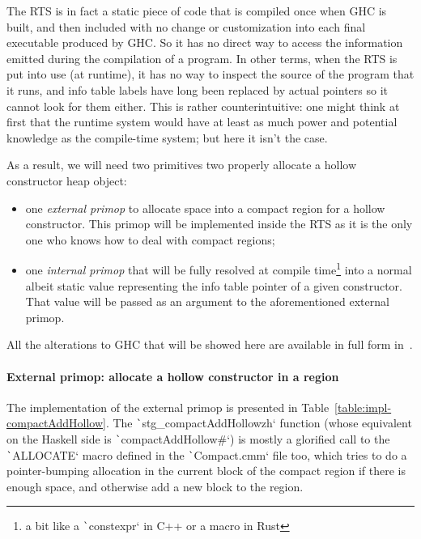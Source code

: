 \documentclass[english]{jflart}
\begin{document}
The RTS is in fact a static piece of code that is compiled once when GHC is built, and then included with no change or customization into each final executable produced by GHC. So it has no direct way to access the information emitted during the compilation of a program. In other terms, when the RTS is put into use (at runtime), it has no way to inspect the source of the program that it runs, and info table labels have long been replaced by actual pointers so it cannot look for them either. This is rather counterintuitive: one might think at first that the runtime system would have at least as much power and potential knowledge as the compile-time system; but here it isn't the case.

As a result, we will need two primitives two properly allocate a hollow constructor heap object:

\begin{itemize}
\item one \emph{external primop} to allocate space into a compact region for a hollow constructor. This primop will be implemented inside the RTS as it is the only one who knows how to deal with compact regions;
\item one \emph{internal primop} that will be fully resolved at compile time\footnote{a bit like a \texttt`constexpr` in C++ or a macro in Rust} into a normal albeit static value representing the info table pointer of a given constructor. That value will be passed as an argument to the aforementioned external primop.
\end{itemize}

All the alterations to GHC that will be showed here are available in full form in~\cite{custom_ghc}.

\paragraph{External primop: allocate a hollow constructor in a region}

The implementation of the external primop is presented in Table~\ref{table:impl-compactAddHollow}. The \texttt`stg_compactAddHollowzh` function (whose equivalent on the Haskell side is \texttt`compactAddHollow#`) is mostly a glorified call to the \texttt`ALLOCATE` macro defined in the \texttt`Compact.cmm` file too, which tries to do a pointer-bumping allocation in the current block of the compact region if there is enough space, and otherwise add a new block to the region.
\end{document}
